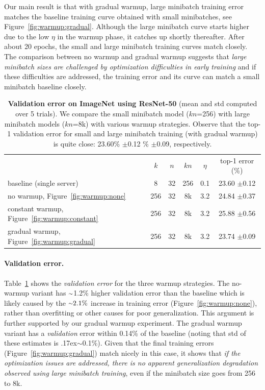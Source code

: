 \documentclass[10pt,twocolumn,letterpaper]{article}
\newcommand{\bd}[1]{\textbf{#1}}
\newcommand{\app}{\raise.17ex\hbox{$\scriptstyle\sim$}}
\newcommand{\tablestyle}[2]{\setlength{\tabcolsep}{#1}\renewcommand{\arraystretch}{#2}\centering\footnotesize}
\begin{document}
Our main result is that with gradual warmup, large minibatch training error matches the baseline training curve obtained with small minibatches, see Figure~\ref{fig:warmup:gradual}. Although the large minibatch curve starts higher due to the low $\eta$ in the warmup phase, it catches up shortly thereafter. After about 20 epochs, the small and large minibatch training curves match closely. The comparison between no warmup and gradual warmup suggests that \emph{large minibatch sizes are challenged by optimization difficulties in early training} and if these difficulties are addressed, the training error and its curve can match a small minibatch baseline closely.

\begin{table}[t]
\tablestyle{5pt}{1.2}
\begin{tabular}{l|ccccc}
 & $k$ & $n$ & $kn$ & $\eta$ & top-1 error (\%)\\ [.1em]
\shline
 baseline (single server) & 8 & 32 & 256 & 0.1 & 23.60 $\pm$0.12 \\
\hline
no warmup, Figure~\ref{fig:warmup:none} & 256 & 32 & 8k & 3.2 & 24.84 $\pm$0.37 \\
constant warmup, Figure~\ref{fig:warmup:constant} & 256 & 32 & 8k & 3.2 & 25.88 $\pm$0.56 \\
gradual warmup, Figure~\ref{fig:warmup:gradual} & 256 & 32 & 8k & 3.2 & 23.74 $\pm$0.09 \\
\end{tabular}\vspace{3mm}
\caption{\bd{Validation error on ImageNet using ResNet-50} (mean and std computed over 5 trials). We compare the small minibatch model ($kn$=256) with large minibatch models ($kn$=8k) with various warmup strategies. Observe that the top-1 validation error for small and large minibatch training (with gradual warmup) is quite close: 23.60\% $\pm$0.12 \% $\pm$0.09, respectively.}\label{tab:val}
\end{table}

\paragraph{Validation error.} Table~\ref{tab:val} shows the \emph{validation error} for the three warmup strategies. The no-warmup variant has $\app$1.2\% higher validation error than the baseline which is likely caused by the $\app2.1\%$ increase in training error (Figure~\ref{fig:warmup:none}), rather than overfitting or other causes for poor generalization. This argument is further supported by our gradual warmup experiment. The gradual warmup variant has a \emph{validation} error within 0.14\% of the baseline (noting that std of these estimates is \app0.1\%). Given that the final training errors (Figure~\ref{fig:warmup:gradual}) match nicely in this case, it shows that \emph{if the optimization issues are addressed, there is no apparent generalization degradation observed using large minibatch training}, even if the minibatch size goes from 256 to 8k.
\end{document}
